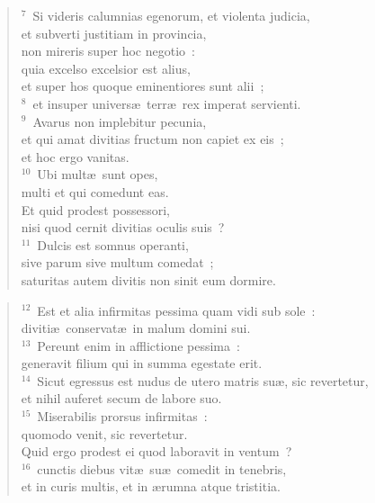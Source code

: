 \begin{flushleft}\begin{verse}${}^{7}$~Si videris calumnias egenorum, et violenta judicia,\\ et subverti justitiam in provincia,\\ non mireris super hoc negotio~:\\ quia excelso excelsior est alius,\\ et super hos quoque eminentiores sunt alii~;\\
${}^{8}$~et insuper univers\ae\ terr\ae\ rex imperat servienti.\\
${}^{9}$~Avarus non implebitur pecunia,\\ et qui amat divitias fructum non capiet ex eis~;\\ et hoc ergo vanitas.\\
${}^{10}$~Ubi mult\ae\ sunt opes,\\ multi et qui comedunt eas.\\ Et quid prodest possessori,\\ nisi quod cernit divitias oculis suis~?\\
${}^{11}$~Dulcis est somnus operanti,\\ sive parum sive multum comedat~;\\ saturitas autem divitis non sinit eum dormire.\end{verse}\end{flushleft}


\begin{flushleft}\begin{verse}${}^{12}$~Est et alia infirmitas pessima quam vidi sub sole~:\\ diviti\ae\ conservat\ae\ in malum domini sui.\\
${}^{13}$~Pereunt enim in afflictione pessima~:\\ generavit filium qui in summa egestate erit.\\
${}^{14}$~Sicut egressus est nudus de utero matris su\ae , sic revertetur,\\ et nihil auferet secum de labore suo.\\
${}^{15}$~Miserabilis prorsus infirmitas~:\\ quomodo venit, sic revertetur.\\ Quid ergo prodest ei quod laboravit in ventum~?\\
${}^{16}$~cunctis diebus vit\ae\ su\ae\ comedit in tenebris,\\ et in curis multis, et in \ae rumna atque tristitia.\end{verse}\end{flushleft}



